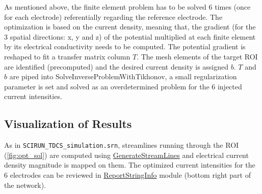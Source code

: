 \documentclass[fleqn,11pt,openany]{book}
\begin{document}
As mentioned above, the finite element problem has to be solved 6 times (once for each electrode) referentially regarding the reference electrode.
The optimization is based on the current density, meaning that, the gradient (for the 3 spatial directions: x, y and z) of the potential multiplied at each finite element by its
electrical conductivity needs to be computed.
The potential gradient is reshaped to fit a transfer matrix column $T$. The mesh elements of the target ROI are identified (precomputed) and the desired current density is assigned $b$.
$T$ and $b$ are piped into SolveInverseProblemWithTikhonov, a small regularization parameter is set and solved as an overdetermined problem for the 6 injected current intensities.  

\subsection{Visualization of Results}

As in \texttt{SCIRUN\_TDCS\_simulation.srn}, streamlines running through the ROI (\ref{fig:opt_sol}) are computed using \href{http://scirundocwiki.sci.utah.edu/SCIRunDocs/index.php5/CIBC:Documentation:SCIRun:Reference:SCIRun:GenerateStreamLines}{GenerateStreamLines} and electrical current density magnitude is mapped on them.
The optimized current intensities for the 6 electrodes can be reviewed in \href{http://scirundocwiki.sci.utah.edu/SCIRunDocs/index.php5/CIBC:Documentation:SCIRun:Reference:SCIRun:ReportStringInfo}{ReportStringInfo} module (bottom right part of the network).
\end{document}
